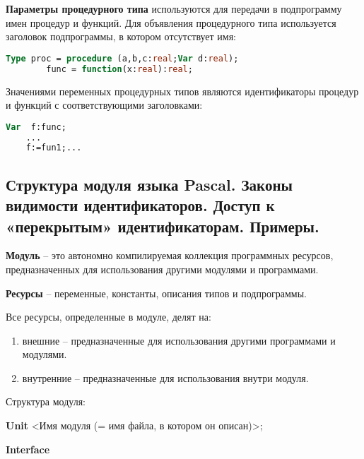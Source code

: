{\bf{Параметры процедурного типа}} используются для передачи в подпрограмму имен процедур и функций. Для объявления процедурного типа используется заголовок подпрограммы, в котором отсутствует имя:

\begin{lstlisting}[language = pascal]
	Type proc = procedure (a,b,c:real;Var d:real);
        func = function(x:real):real;
\end{lstlisting}

Значениями переменных процедурных типов являются идентификаторы процедур и функций с соответствующими заголовками:

\begin{lstlisting}[language = pascal]
	Var  f:func;
	...
	f:=fun1;...
\end{lstlisting}




\newpage\subsection{Структура модуля языка Pascal. Законы видимости идентификаторов. Доступ к «перекрытым» идентификаторам. Примеры. }


\begin{myquote}
            
\end{myquote}

{\bf Модуль} – это автономно компилируемая коллекция программных ресурсов, предназначенных для использования другими модулями и программами.

{\bf Ресурсы} – переменные, константы, описания типов и подпрограммы.

Все ресурсы, определенные в модуле, делят на:

\begin{enumerate}
\item внешние – предназначенные для использования другими программами и модулями.
\item внутренние – предназначенные для использования внутри модуля.
\end{enumerate}

Структура модуля:

{\bf Unit} <Имя модуля (= имя файла, в котором он описан)>;

{\bf Interface }

